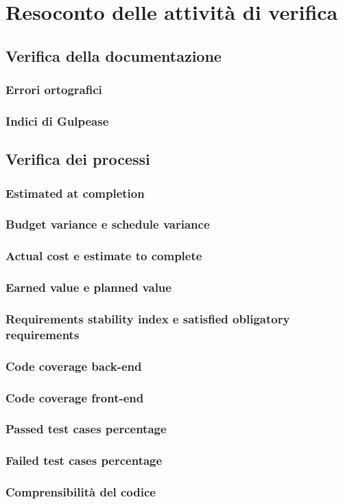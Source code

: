 \documentclass[10pt, a4paper]{article}
\begin{document}
\section{Resoconto delle attività di verifica}

\subsection{Verifica della documentazione}
\subsubsection{Errori ortografici}
\subsubsection{Indici di Gulpease}

\subsection{Verifica dei processi}
\subsubsection{Estimated at completion}
\subsubsection{Budget variance e schedule variance}
\subsubsection{Actual cost e estimate to complete}
\subsubsection{Earned value e planned value}
\subsubsection{Requirements stability index e satisfied obligatory requirements}
\subsubsection{Code coverage back-end}
\subsubsection{Code coverage front-end}
\subsubsection{Passed test cases percentage}
\subsubsection{Failed test cases percentage}
\subsubsection{Comprensibilità del codice}
\end{document}
